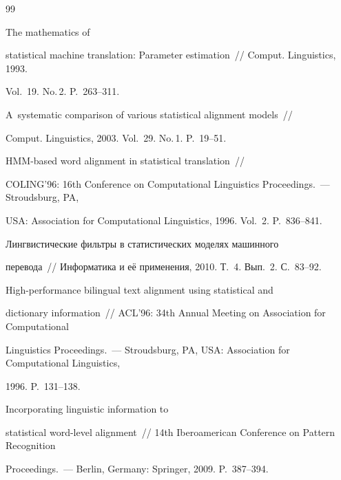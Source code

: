 {\small\frenchspacing


{%




\begin{thebibliography}{99}




 The mathematics of


statistical machine translation: Parameter estimation~/\!\!/ Comput. Linguistics, 1993.


Vol.~19. No.\,2. P.~263--311.




 A~systematic comparison of various statistical alignment models~/\!\!/


Comput. Linguistics, 2003. Vol.~29. No.\,1. P.~19--51.




 HMM-based word alignment in statistical translation~/\!\!/


COLING'96: 16th Conference on Computational Linguistics Proceedings.~--- Stroudsburg, PA,


USA: Association for Computational Linguistics, 1996. Vol.~2. P.~836--841.




 Лингвистические фильтры в статистических моделях машинного


перевода~/\!\!/ Информатика и её применения, 2010. Т.~4. Вып.~2. С.~83--92.




 High-performance bilingual text alignment using statistical and


dictionary information~/\!\!/ ACL'96:  34th Annual Meeting on Association for Computational


Linguistics Proceedings.~--- Stroudsburg, PA, USA: Association for Computational Linguistics,


1996. P.~131--138.




 Incorporating linguistic information to


statistical word-level alignment~/\!\!/  14th Iberoamerican Conference on Pattern Recognition


Proceedings.~--- Berlin, Germany: Springer, 2009. P.~387--394.



\end{thebibliography}}}
